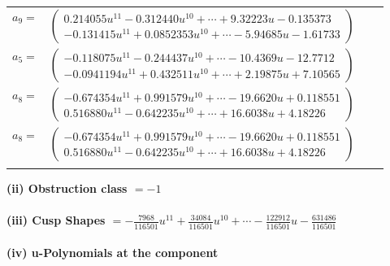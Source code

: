 \documentclass[1p]{elsarticle_modified}
\theoremstyle{definition}
\begin{document}
\begin{tabular}{m{7pt} m{180pt} m{7pt} m{180pt} }
\flushright $a_{9}=$&$\begin{pmatrix}0.214055 u^{11}-0.312440 u^{10}+\cdots+9.32223 u-0.135373\\-0.131415 u^{11}+0.0852353 u^{10}+\cdots-5.94685 u-1.61733\end{pmatrix}$ \\
\flushright $a_{5}=$&$\begin{pmatrix}-0.118075 u^{11}-0.244437 u^{10}+\cdots-10.4369 u-12.7712\\-0.0941194 u^{11}+0.432511 u^{10}+\cdots+2.19875 u+7.10565\end{pmatrix}$ \\
\flushright $a_{8}=$&$\begin{pmatrix}-0.674354 u^{11}+0.991579 u^{10}+\cdots-19.6620 u+0.118551\\0.516880 u^{11}-0.642235 u^{10}+\cdots+16.6038 u+4.18226\end{pmatrix}$\\ \flushright $a_{8}=$&$\begin{pmatrix}-0.674354 u^{11}+0.991579 u^{10}+\cdots-19.6620 u+0.118551\\0.516880 u^{11}-0.642235 u^{10}+\cdots+16.6038 u+4.18226\end{pmatrix}$\\&\end{tabular}
\flushleft \textbf{(ii) Obstruction class $= -1$}\\~\\
\flushleft \textbf{(iii) Cusp Shapes $= -\frac{7968}{116501} u^{11}+\frac{34084}{116501} u^{10}+\cdots-\frac{122912}{116501} u-\frac{631486}{116501}$}\\~\\
\newpage\renewcommand{\arraystretch}{1}
\flushleft \textbf{(iv) u-Polynomials at the component}\newline \\
\end{document}
